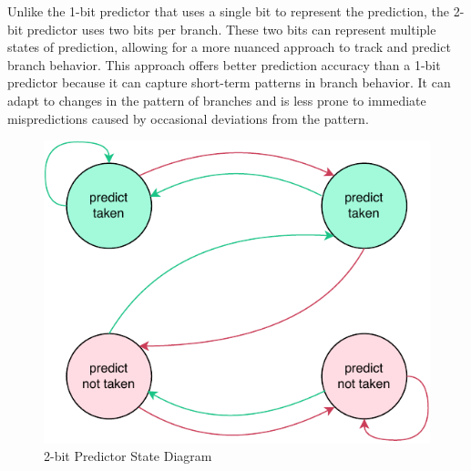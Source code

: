 \documentclass[12pt,a4paper,oneside]{book} %
\begin{document}

Unlike the 1-bit predictor that uses a single bit to represent the prediction, the 2-bit predictor uses two bits per branch. These two bits can represent multiple states of prediction, allowing for a more nuanced approach to track and predict branch behavior. This approach offers better prediction accuracy than a 1-bit predictor because it can capture short-term patterns in branch behavior. It can adapt to changes in the pattern of branches and is less prone to immediate mispredictions caused by occasional deviations from the pattern.






\begin{figure}[H]
    \centering
    \includegraphics[width=.5\textwidth]{images/predictor/2-bit.pdf}
    \caption{2-bit Predictor State Diagram}
\end{figure}
\end{document}
